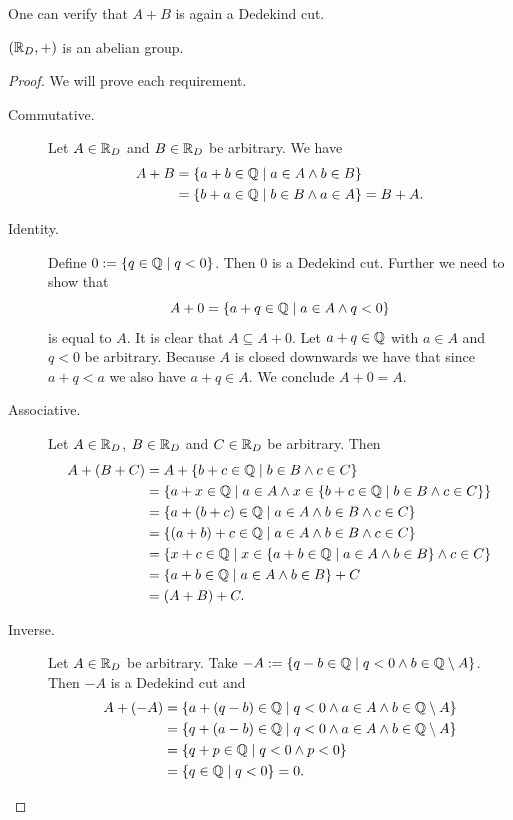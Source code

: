 \documentclass[../main.tex]{subfiles}
\begin{document}
One can verify that $A+B$ is again a Dedekind cut.
\begin{proposition}\label{prp:the_real_numbers:dedekind_abelian_group_real_numbers}
    $(\mathbb{R}_D,+)$ is an abelian group.
\end{proposition}
\begin{proof}
    We will prove each requirement.
    \begin{description}
        \item[Commutative.] Let $A\in\mathbb{R}_D$ and $B\in\mathbb{R}_D$ be arbitrary. We have
        \begin{align*}
            A+B & =\{a+b\in\mathbb{Q}\mid a\in A\land b\in B\} \\
            & =\{b+a\in\mathbb{Q}\mid b\in B\land a\in A\}=B+A.
        \end{align*}
        \item[Identity.] Define $0:=\{q\in\mathbb{Q}\mid q<0\}$. Then $0$ is a Dedekind cut. Further we need to show that
        \begin{equation*}
            A+0=\{a+q\in\mathbb{Q}\mid a\in A\land q<0\}
        \end{equation*}
        is equal to $A$. It is clear that $A\subseteq A+0$. Let $a+q\in\mathbb{Q}$ with $a\in A$ and $q<0$ be arbitrary. Because $A$ is closed downwards we have that since $a+q<a$ we also have $a+q\in A$. We conclude $A+0=A$.
        \item[Associative.] Let $A\in\mathbb{R}_D$, $B\in\mathbb{R}_D$ and $C\in\mathbb{R}_D$ be arbitrary. Then
        \begin{align*}
            A+(B+C) & =A+\{b+c\in\mathbb{Q}\mid b\in B\land c\in C\} \\
            & =\{a+x\in\mathbb{Q}\mid a\in A\land x\in\{b+c\in\mathbb{Q}\mid b\in B\land c\in C\}\} \\
            & =\{a+(b+c)\in\mathbb{Q}\mid a\in A\land b\in B\land c\in C\} \\
            & =\{(a+b)+c\in\mathbb{Q}\mid a\in A\land b\in B\land c\in C\} \\
            & =\{x+c\in\mathbb{Q}\mid x\in\{a+b\in\mathbb{Q}\mid a\in A\land b\in B\}\land c\in C\} \\
            & =\{a+b\in\mathbb{Q}\mid a\in A\land b\in B\}+C \\
            & =(A+B)+C.
        \end{align*}
        \item[Inverse.] Let $A\in\mathbb{R}_D$ be arbitrary. Take $-A:=\{q-b\in\mathbb{Q}\mid q<0\land b\in\mathbb{Q}\setminus A\}$. Then $-A$ is a Dedekind cut and
        \begin{align*}
            A+(-A) & =\{a+(q-b)\in\mathbb{Q}\mid q<0\land a\in A\land b\in\mathbb{Q}\setminus A\} \\
            & =\{q+(a-b)\in\mathbb{Q}\mid q<0\land a\in A\land b\in\mathbb{Q}\setminus A\} \\
            & =\{q+p\in\mathbb{Q}\mid q<0\land p<0\} \\
            & =\{q\in\mathbb{Q}\mid q<0\}=0.
        \end{align*}
    \end{description}
\end{proof}
\end{document}
